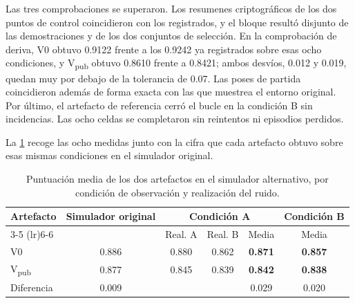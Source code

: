 
Las tres comprobaciones se superaron. Los resumenes criptogr\'aficos de los dos puntos de
control coincidieron con los registrados, y el bloque result\'o disjunto de las
demostraciones y de los dos conjuntos de selecci\'on. En la comprobaci\'on de deriva, V0
obtuvo \num{0.9122} frente a los \num{0.9242} ya registrados sobre esas ocho condiciones, y
V\textsubscript{pub} obtuvo \num{0.8610} frente a \num{0.8421}; ambos desv\'ios, \num{0.012}
y \num{0.019}, quedan muy por debajo de la tolerancia de \num{0.07}. Las poses de partida
coincidieron adem\'as de forma exacta con las que muestrea el entorno original. Por
\'ultimo, el artefacto de referencia cerr\'o el bucle en la condici\'on B sin incidencias.
Las ocho celdas se completaron sin reintentos ni episodios perdidos.


La \cref{tab:godot-puntuaciones} recoge las ocho medidas junto con la cifra que cada
artefacto obtuvo sobre esas mismas condiciones en el simulador original.

\begin{table}[htbp]
  \centering
  \caption{Puntuaci\'on media de los dos artefactos en el simulador alternativo, por
    condici\'on de observaci\'on y realizaci\'on del ruido.}
  \label{tab:godot-puntuaciones}
  \small
  \scriptsize
  \begin{tabular}{l c cc c c}
    \toprule
    Artefacto & Simulador original & \multicolumn{3}{c}{Condici\'on A} & Condici\'on B \\
    \cmidrule(lr){3-5} \cmidrule(lr){6-6}
    & & Real. A & Real. B & Media & Media \\
    \midrule
    V0                   & \num{0.886} & \num{0.880} & \num{0.862} & \textbf{\num{0.871}} &
      \textbf{\num{0.857}} \\
    V\textsubscript{pub} & \num{0.877} & \num{0.845} & \num{0.839} & \textbf{\num{0.842}} &
      \textbf{\num{0.838}} \\
    \midrule
    Diferencia & \num{0.009} & & & \num{0.029} & \num{0.020} \\
    \bottomrule
  \end{tabular}
\end{table}

